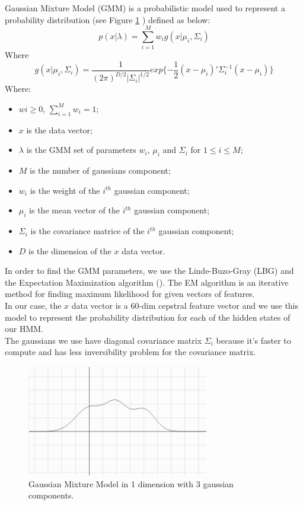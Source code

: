 \documentclass{techrep} %
\begin{document}
Gaussian Mixture Model (GMM) is a probabilistic model used to
represent a probability distribution (see Figure \ref{gmmschem} )
defined as below:\\
$$ p(x|\lambda) = \sum_{i=1}^{M} w_i g(x|\mu_i,\Sigma_i)$$
Where\\
$$ g(x|\mu_i,\Sigma_i) =
\frac{1}{(2\pi)^{D/2}|\Sigma_i|^{1/2}}exp{\{-\frac{1}{2}(x-\mu_i)'\Sigma_i^{-1}(x-\mu_i)\}} $$
Where:
\begin{itemize}
\item $wi \ge 0$, $\sum_{i=1}^{M} w_i = 1$;
\item $x$ is the data vector;
\item $\lambda$ is the GMM set of parameters $w_i$, $\mu_i$ and
  $\Sigma_i$ for $1 \leq i \leq M$;
\item $M$ is the number of gaussians component;
\item $w_i$ is the weight of the $i^{th}$ gaussian component;
\item $\mu_i$ is the mean vector of the $i^{th}$ gaussian component;
\item $\Sigma_i$ is the covariance matrice of the $i^{th}$ gaussian
  component;
\item $D$ is the dimension of the $x$ data vector.
\end{itemize}
In order to find the GMM parameters, we use the Linde-Buzo-Gray (LBG)
and the Expectation Maximization algorithm (\cite{EM}). The EM
algorithm is an iterative method for finding maximum likelihood for
given vectors of features.\\ In our case, the $x$ data vector is a
60-dim cepstral feature vector and we use this model to represent the
probability distribution for each of the hidden states of our
HMM.\\ The gaussians we use have diagonal covariance matrix $\Sigma_i$
because it's faster to compute and has less inversibility problem for
the covariance matrix.

\begin{figure}[H]
  \centering \includegraphics[width=300px]{gmm}
  \caption{Gaussian Mixture Model in 1 dimension with 3 gaussian components.}
  \label{gmmschem}
\end{figure}
\end{document}

